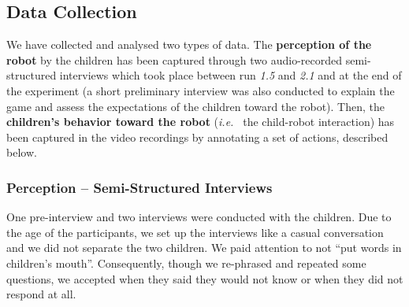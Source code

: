 \documentclass[letterpaper, 10pt, conference]{ieeeconf}
\newcommand{\ie}{{\textit{i.e.~}}}
\begin{document}
\subsection{Data Collection}


We have collected and analysed two types of data. The \textbf{perception of the
robot} by the children has been captured through two audio-recorded
semi-structured interviews which took place between run \emph{1.5} and
\emph{2.1} and at the end of the experiment (a short preliminary interview was
also conducted to explain the game and assess the expectations of the children
toward the robot).  Then, the \textbf{children's behavior toward the robot} (\ie
the child-robot interaction) has been captured in the video recordings by
annotating a set of actions, described below. 

\subsubsection{Perception -- Semi-Structured Interviews}

One pre-interview and two interviews were conducted with the children. Due to
the age of the participants, we set up the interviews like a casual conversation
and we did not separate the two children. We paid attention to not ``put words
in children's mouth''.  Consequently, though we re-phrased and repeated some
questions, we accepted when they said they would not know or when they did not
respond at all.
\end{document}
